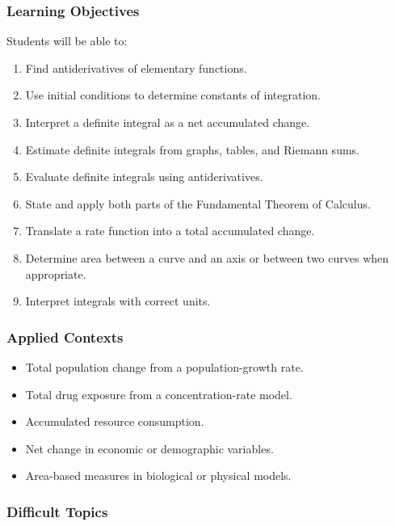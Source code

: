 \documentclass[11pt]{article}
\begin{document}
\subsubsection{Learning Objectives}

Students will be able to:

\begin{enumerate}
    \item Find antiderivatives of elementary functions.
    \item Use initial conditions to determine constants of integration.
    \item Interpret a definite integral as a net accumulated change.
    \item Estimate definite integrals from graphs, tables, and Riemann sums.
    \item Evaluate definite integrals using antiderivatives.
    \item State and apply both parts of the Fundamental Theorem of Calculus.
    \item Translate a rate function into a total accumulated change.
    \item Determine area between a curve and an axis or between two curves when appropriate.
    \item Interpret integrals with correct units.
\end{enumerate}

\subsubsection{Applied Contexts}

\begin{itemize}
    \item Total population change from a population-growth rate.
    \item Total drug exposure from a concentration-rate model.
    \item Accumulated resource consumption.
    \item Net change in economic or demographic variables.
    \item Area-based measures in biological or physical models.
\end{itemize}

\subsubsection{Difficult Topics}
\end{document}
